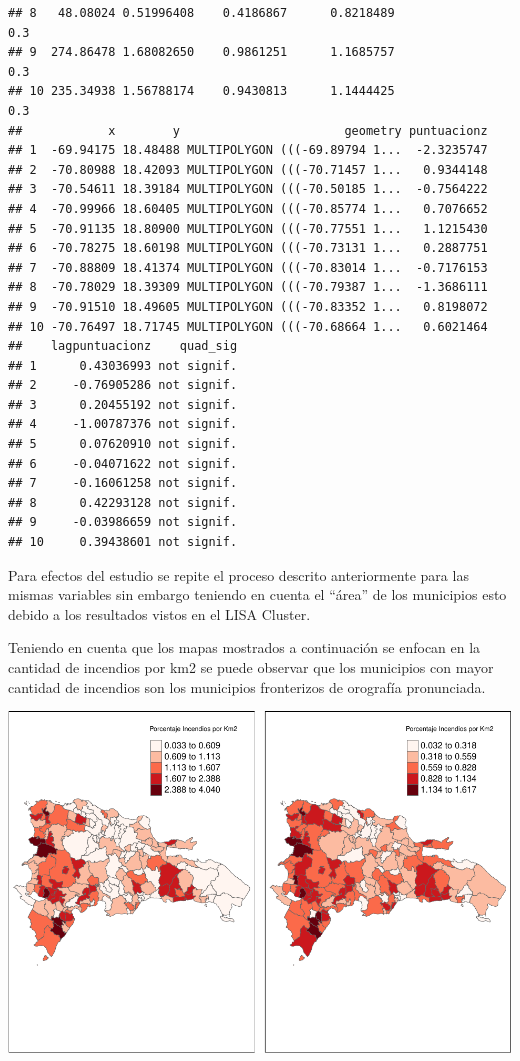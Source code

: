 \documentclass[11pt,]{article}
\begin{document}
\begin{verbatim}
## 8   48.08024 0.51996408    0.4186867      0.8218489                   0.3
## 9  274.86478 1.68082650    0.9861251      1.1685757                   0.3
## 10 235.34938 1.56788174    0.9430813      1.1444425                   0.3
##            x        y                       geometry puntuacionz
## 1  -69.94175 18.48488 MULTIPOLYGON (((-69.89794 1...  -2.3235747
## 2  -70.80988 18.42093 MULTIPOLYGON (((-70.71457 1...   0.9344148
## 3  -70.54611 18.39184 MULTIPOLYGON (((-70.50185 1...  -0.7564222
## 4  -70.99966 18.60405 MULTIPOLYGON (((-70.85774 1...   0.7076652
## 5  -70.91135 18.80900 MULTIPOLYGON (((-70.77551 1...   1.1215430
## 6  -70.78275 18.60198 MULTIPOLYGON (((-70.73131 1...   0.2887751
## 7  -70.88809 18.41374 MULTIPOLYGON (((-70.83014 1...  -0.7176153
## 8  -70.78029 18.39309 MULTIPOLYGON (((-70.79387 1...  -1.3686111
## 9  -70.91510 18.49605 MULTIPOLYGON (((-70.83352 1...   0.8198072
## 10 -70.76497 18.71745 MULTIPOLYGON (((-70.68664 1...   0.6021464
##    lagpuntuacionz    quad_sig
## 1      0.43036993 not signif.
## 2     -0.76905286 not signif.
## 3      0.20455192 not signif.
## 4     -1.00787376 not signif.
## 5      0.07620910 not signif.
## 6     -0.04071622 not signif.
## 7     -0.16061258 not signif.
## 8      0.42293128 not signif.
## 9     -0.03986659 not signif.
## 10     0.39438601 not signif.
\end{verbatim}

Para efectos del estudio se repite el proceso descrito anteriormente
para las mismas variables sin embargo teniendo en cuenta el ``área'' de
los municipios esto debido a los resultados vistos en el LISA Cluster.

Teniendo en cuenta que los mapas mostrados a continuación se enfocan en
la cantidad de incendios por km2 se puede observar que los municipios
con mayor cantidad de incendios son los municipios fronterizos de
orografía pronunciada.

\includegraphics{proyecto_files/figure-latex/unnamed-chunk-26-1.pdf}
\end{document}
